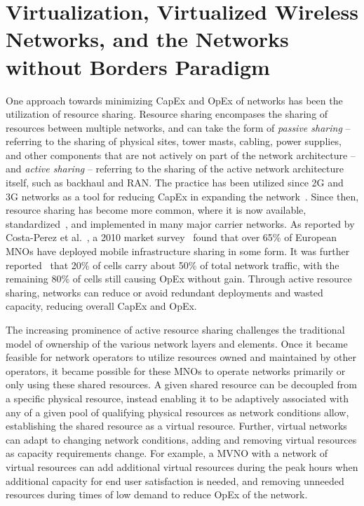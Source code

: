 \documentclass[12pt,dvipsnames]{report}
\begin{document}
\section{Virtualization, Virtualized Wireless Networks, and the Networks without Borders Paradigm} \label{sec:virtualization}

One approach towards minimizing CapEx and OpEx of networks has been the utilization of resource sharing.  Resource sharing encompases the sharing of resources between multiple networks, and can take the form of \emph{passive sharing} -- referring to the sharing of physical sites, tower masts, cabling, power supplies, and other components that are not actively on part of the network architecture -- and \emph{active sharing} -- referring to the sharing of the active network architecture itself, such as backhaul and RAN.  The practice has been utilized since 2G and 3G networks as a tool for reducing CapEx in expanding the network~\cite{1421931}.  Since then, resource sharing has become more common, where it is now available, standardized~\cite{3GPP_TS_23.251}, and implemented in many major carrier networks.  As reported by Costa-Perez et al.~\cite{6553675}, a 2010 market survey~\cite{NetSharingReport} found that over 65\% of European MNOs have deployed mobile infrastructure sharing in some form.  It was further reported~\cite{6553675} that 20\% of cells carry about 50\% of total network traffic, with the remaining 80\% of cells still causing OpEx without gain.  Through active resource sharing, networks can reduce or avoid redundant deployments and wasted capacity, reducing overall CapEx and OpEx.

The increasing prominence of active resource sharing challenges the traditional model of ownership of the various network layers and elements.  Once it became feasible for network operators to utilize resources owned and maintained by other operators, it became possible for these MNOs to operate networks primarily or only using these shared resources.  A given shared resource can be decoupled from a specific physical resource, instead enabling it to be adaptively associated with any of a given pool of qualifying physical resources as network conditions allow, establishing the shared resource as a virtual resource.  Further, virtual networks can adapt to changing network conditions, adding and removing virtual resources as capacity requirements change.  For example, a MVNO with a network of virtual resources can add additional virtual resources during the peak hours when additional capacity for end user satisfaction is needed, and removing unneeded resources during times of low demand to reduce OpEx of the network.
\end{document}
